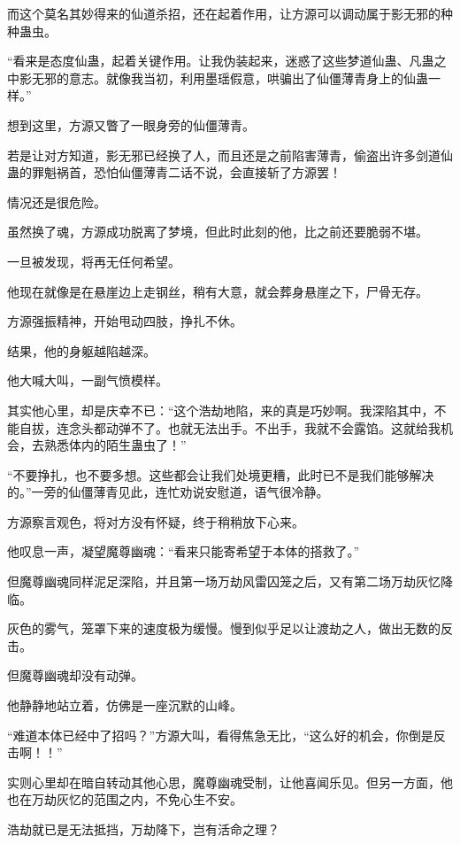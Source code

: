 \begin{this_body}
而这个莫名其妙得来的仙道杀招，还在起着作用，让方源可以调动属于影无邪的种种蛊虫。

“看来是态度仙蛊，起着关键作用。让我伪装起来，迷惑了这些梦道仙蛊、凡蛊之中影无邪的意志。就像我当初，利用墨瑶假意，哄骗出了仙僵薄青身上的仙蛊一样。”

想到这里，方源又瞥了一眼身旁的仙僵薄青。

若是让对方知道，影无邪已经换了人，而且还是之前陷害薄青，偷盗出许多剑道仙蛊的罪魁祸首，恐怕仙僵薄青二话不说，会直接斩了方源罢！

情况还是很危险。

虽然换了魂，方源成功脱离了梦境，但此时此刻的他，比之前还要脆弱不堪。

一旦被发现，将再无任何希望。

他现在就像是在悬崖边上走钢丝，稍有大意，就会葬身悬崖之下，尸骨无存。

方源强振精神，开始甩动四肢，挣扎不休。

结果，他的身躯越陷越深。

他大喊大叫，一副气愤模样。

其实他心里，却是庆幸不已：“这个浩劫地陷，来的真是巧妙啊。我深陷其中，不能自拔，连念头都动弹不了。也就无法出手。不出手，我就不会露馅。这就给我机会，去熟悉体内的陌生蛊虫了！”

“不要挣扎，也不要多想。这些都会让我们处境更糟，此时已不是我们能够解决的。”一旁的仙僵薄青见此，连忙劝说安慰道，语气很冷静。

方源察言观色，将对方没有怀疑，终于稍稍放下心来。

他叹息一声，凝望魔尊幽魂：“看来只能寄希望于本体的搭救了。”

但魔尊幽魂同样泥足深陷，并且第一场万劫风雷囚笼之后，又有第二场万劫灰忆降临。

灰色的雾气，笼罩下来的速度极为缓慢。慢到似乎足以让渡劫之人，做出无数的反击。

但魔尊幽魂却没有动弹。

他静静地站立着，仿佛是一座沉默的山峰。

“难道本体已经中了招吗？”方源大叫，看得焦急无比，“这么好的机会，你倒是反击啊！！”

实则心里却在暗自转动其他心思，魔尊幽魂受制，让他喜闻乐见。但另一方面，他也在万劫灰忆的范围之内，不免心生不安。

浩劫就已是无法抵挡，万劫降下，岂有活命之理？

\end{this_body}

